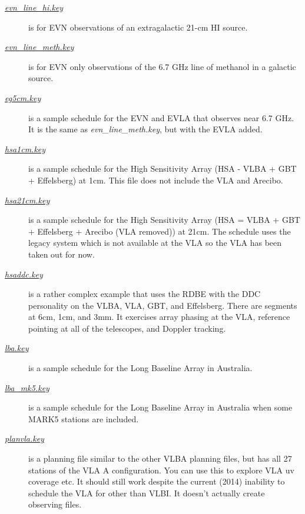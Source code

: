 \documentclass{report}
\begin{document}
\begin{description}
\item[
{\href{examples/evn\_line\_hi.key}{{\sl evn\_line\_hi.key}}}]
is for EVN observations of an extragalactic
21-cm HI source.

\item[
{\href{examples/evn\_line\_meth.key}{{\sl evn\_line\_meth.key}}}]
is for EVN only observations of the
6.7 GHz line of methanol in a galactic source.

\item[
{\href{examples/eg5cm.key}{{\sl eg5cm.key}}}] is a
sample schedule for the EVN and EVLA that observes near 6.7 GHz.  It
is the same as {\sl evn\_line\_meth.key}, but with the EVLA added.

\item[
{\href{examples/hsa1cm.key}{{\sl hsa1cm.key}}}] is a
sample schedule for the High Sensitivity Array (HSA - VLBA + GBT +
Effelsberg) at 1cm.  This file does not include the
VLA and Arecibo.

\item[
{\href{examples/hsa21cm.key}{{\sl hsa21cm.key}}}] is a
sample schedule for the High Sensitivity Array (HSA = VLBA + GBT +
Effelsberg + Arecibo (VLA removed)) at 21cm.  The schedule uses the
legacy system which is not available at the VLA so the VLA has been taken
out for now.

\item[
{\href{examples/hsaddc.key}{{\sl hsaddc.key}}}] is
a rather complex example that uses the RDBE with the DDC personality
on the VLBA, VLA, GBT, and Effelsberg.  There are segments
at 6cm, 1cm, and 3mm.  It exercises array phasing 
at the VLA, reference pointing at all of the telescopes, and Doppler 
tracking.

\item[
{\href{examples/lba.key}{{\sl lba.key}}}] is a
sample schedule for the Long Baseline Array in Australia.

\item[
{\href{examples/lba\_mk5.key}{{\sl lba\_mk5.key}}}] is a
sample schedule for the Long Baseline Array in Australia when some
MARK5 stations are included.

\item[
{\href{examples/planvla.key}{{\sl planvla.key}}}] is a
planning file similar to the other VLBA planning files, but has
all 27 stations of the VLA A configuration.  You can use this to
explore VLA uv coverage etc.  It should still work despite the current
(2014) inability to schedule the VLA for other than VLBI.  It doesn't
actually create observing files.


\end{description}
\end{document}
